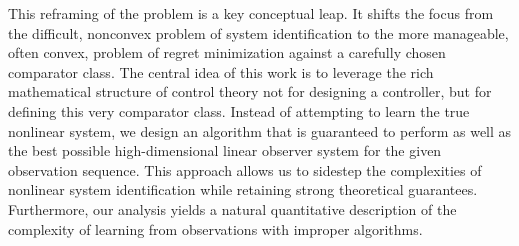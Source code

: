 \documentclass[11pt]{article}
\numberwithin{equation}{section}
\begin{document}
This reframing of the problem is a key conceptual leap. It shifts the focus from the difficult, nonconvex problem of system identification to the more manageable, often convex, problem of regret minimization against a carefully chosen comparator class. The central idea of this work is to leverage the rich mathematical structure of control theory not for designing a controller, but for defining this very comparator class. Instead of attempting to learn the true nonlinear system, we design an algorithm that is guaranteed to perform as well as the best possible high-dimensional linear observer system for the given observation sequence. This approach allows us to sidestep the complexities of nonlinear system identification while retaining strong theoretical guarantees. Furthermore, our analysis yields a natural quantitative description of the complexity of learning from observations with improper algorithms.
\end{document}
